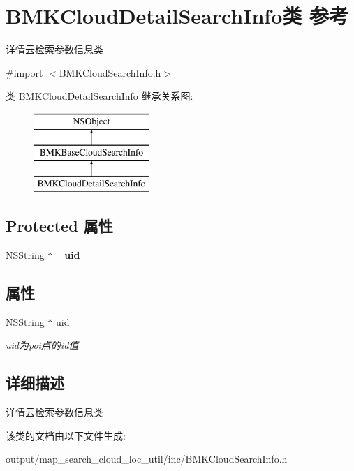 \hypertarget{interface_b_m_k_cloud_detail_search_info}{\section{B\+M\+K\+Cloud\+Detail\+Search\+Info类 参考}
\label{interface_b_m_k_cloud_detail_search_info}
}


详情云检索参数信息类  




{\ttfamily \#import $<$B\+M\+K\+Cloud\+Search\+Info.\+h$>$}

类 B\+M\+K\+Cloud\+Detail\+Search\+Info 继承关系图\+:\begin{figure}[H]
\begin{center}
\leavevmode
\includegraphics[height=3.000000cm]{interface_b_m_k_cloud_detail_search_info}
\end{center}
\end{figure}
\subsection*{Protected 属性}
\begin{DoxyCompactItemize}
\item 
\hypertarget{interface_b_m_k_cloud_detail_search_info_af0561e1d6ce5656002bb7b576ac51b4f}{N\+S\+String $\ast$ {\bfseries \+\_\+uid}}\label{interface_b_m_k_cloud_detail_search_info_af0561e1d6ce5656002bb7b576ac51b4f}

\end{DoxyCompactItemize}
\subsection*{属性}
\begin{DoxyCompactItemize}
\item 
\hypertarget{interface_b_m_k_cloud_detail_search_info_ad553991a75b6d30409a9d3525bea9c52}{N\+S\+String $\ast$ \hyperlink{interface_b_m_k_cloud_detail_search_info_ad553991a75b6d30409a9d3525bea9c52}{uid}}\label{interface_b_m_k_cloud_detail_search_info_ad553991a75b6d30409a9d3525bea9c52}

\begin{DoxyCompactList}\small\item\em uid为poi点的id值 \end{DoxyCompactList}\end{DoxyCompactItemize}


\subsection{详细描述}
详情云检索参数信息类 

该类的文档由以下文件生成\+:\begin{DoxyCompactItemize}
\item 
output/map\+\_\+search\+\_\+cloud\+\_\+loc\+\_\+util/inc/B\+M\+K\+Cloud\+Search\+Info.\+h\end{DoxyCompactItemize}
